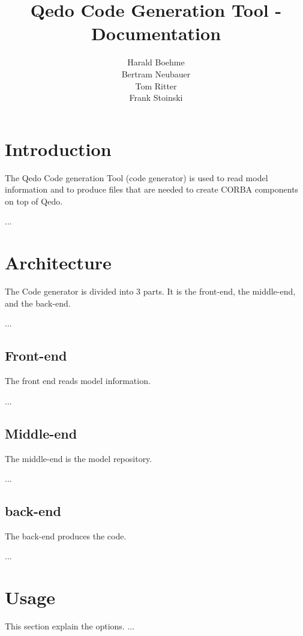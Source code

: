\documentclass[12pt,a4paper]{report}
\begin{document}
\title{Qedo Code Generation Tool - Documentation}
\author{Harald Boehme \\ Bertram Neubauer \\ Tom Ritter \\ Frank Stoinski}

\maketitle

\setcounter{page}{1} 

\tableofcontents


\chapter{Introduction}
\label{sec:Introduction}

The Qedo Code generation Tool (code generator) is used to read model information and to produce files that are needed to create CORBA components on top of Qedo.

...

\chapter{Architecture}
\label{sec:Architecture}
The Code generator is divided into 3 parts. It is the front-end, the middle-end, and the back-end.

 ...

\section{Front-end}
\label{sec:FrontEnd}
The front end reads model information.

 ... 

\section{Middle-end}
\label{sec:MiddleEnd}
The middle-end is the model repository. 

...

\section{back-end}
\label{sec:backEnd}
The back-end produces the code.

...

\chapter{Usage}
\label{sec:Usage}
This section explain the options. ...
\end{document}
